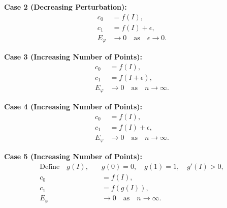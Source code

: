 \textbf{Case 2 (Decreasing Perturbation):}
\begin{align*}
    c_0 &= f(I), \\
    c_1 &= f(I) + \epsilon, \\
    E_{\varphi} &\rightarrow 0 \quad \text{as} \quad \epsilon \rightarrow 0.
\end{align*}

\textbf{Case 3 (Increasing Number of Points):}
\begin{align*}
    c_0 &= f(I), \\
    c_1 &= f(I + \epsilon), \\
    E_{\varphi} &\rightarrow 0 \quad \text{as} \quad n \rightarrow \infty.
\end{align*}

\textbf{Case 4 (Increasing Number of Points):}
\begin{align*}
    c_0 &= f(I), \\
    c_1 &= f(I) + \epsilon, \\
    E_{\varphi} &\rightarrow 0 \quad \text{as} \quad n \rightarrow \infty.
\end{align*}

\textbf{Case 5 (Increasing Number of Points):}
\begin{align*}
    \text{Define} \quad g(I), \quad &g(0) = 0, \quad g(1) = 1, \quad g'(I) > 0, \\
    c_0 &= f(I), \\
    c_1 &= f(g(I)), \\
    E_{\varphi} &\rightarrow 0 \quad \text{as} \quad n \rightarrow \infty.
\end{align*}


